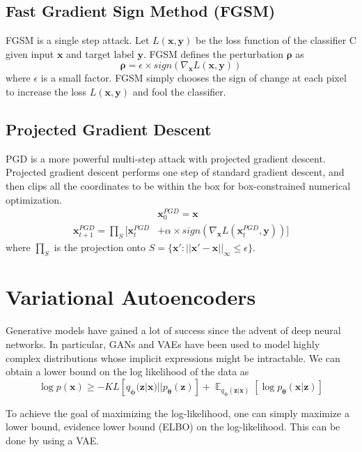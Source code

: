 \documentclass[journal]{IEEEtran}
\newcommand{\bx}{\bm{x}}
\newcommand{\by}{\bm{y}}
\newcommand{\bz}{\bm{z}}
\newcommand{\btheta}{\bm{\theta}}
\newcommand{\bphi}{\bm{\phi}}
\DeclareMathOperator{\expectation}{\mathbb{E}}
\begin{document}
\subsection{Fast Gradient Sign Method (FGSM)}
FGSM\cite{FGSM} is a single step attack. Let $L(\bx, \by)$ be the loss function of the classifier C given input $\bx$ and target label $\by$. FGSM defines the perturbation $\bm{\rho}$ as
\begin{equation}
	\bm{\rho} = \epsilon \times sign(\nabla_{\bx} L(\bx, \by))
\end{equation}
where $\epsilon$ is a small factor. FGSM simply chooses the sign of change at each pixel to increase the loss $L(\bx, \by)$ and fool the classifier.

\subsection{Projected Gradient Descent}
PGD\cite{PGD} is a more powerful multi-step attack with projected gradient descent. Projected gradient descent performs one step of standard gradient descent, and then clips all the coordinates to be within the box for box-constrained numerical optimization. 
\begin{equation}
	\begin{aligned}
		& \bx_0^{PGD} = \bx
		\\
		\bx_{t+1}^{PGD} = \prod_S [\bx_t^{PGD} & + \alpha \times sign(\nabla_{\bx} L(\bx_t^{PGD}, \by))]
	\end{aligned}
\end{equation}
where $\prod_S$ is the projection onto $S = \{\bx' : ||\bx' - \bx||_{\infty} \leq \epsilon\}$.

\section{Variational Autoencoders}
Generative models have gained a lot of success since the advent of deep neural networks. In particular, GANs\cite{GAN} and VAEs\cite{VAE} have been used to model highly complex distributions whose implicit expressions might be intractable. We can obtain a lower bound on the log likelihood of the data as
\begin{equation}
	\log p(\bx) \geq -KL[q_{\bphi}(\bz | \bx) || p_{\btheta}(\bz)] + \expectation_{q_{\bphi}(\bz | \bx)}[\log p_{\btheta}(\bx | \bz)]
\end{equation}

To achieve the goal of maximizing the log-likelihood, one can simply maximize a lower bound, evidence lower bound (ELBO) on the log-likelihood. This can be done by using a VAE.
\end{document}
